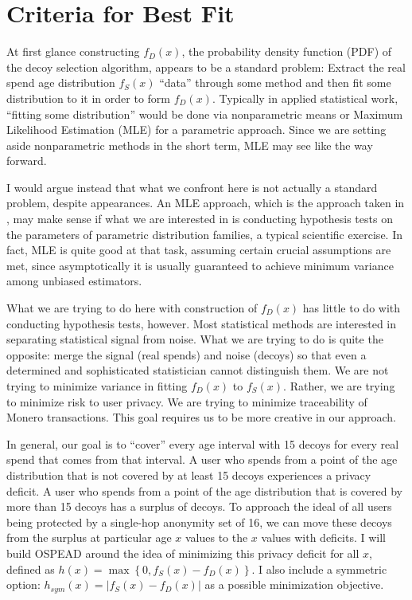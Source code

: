 \documentclass[english]{article}
\begin{document}
\section{Criteria for Best Fit\label{sec:Criteria-for-Best-Fit}}

At first glance constructing $f_{D}(x)$, the probability density
function (PDF) of the decoy selection algorithm, appears to be a standard
problem: Extract the real spend age distribution $f_{S}(x)$ ``data''
through some method and then fit some distribution to it in order
to form $f_{D}(x)$. Typically in applied statistical work, ``fitting
some distribution'' would be done via nonparametric means or Maximum
Likelihood Estimation (MLE) for a parametric approach. Since we are
setting aside nonparametric methods in the short term, MLE may see
like the way forward.

I would argue instead that what we confront here is not actually a
standard problem, despite appearances. An MLE approach, which is the
approach taken in \cite{2018}, may make sense if what we are interested
in is conducting hypothesis tests on the parameters of parametric
distribution families, a typical scientific exercise. In fact, MLE
is quite good at that task, assuming certain crucial assumptions are
met, since asymptotically it is usually guaranteed to achieve minimum
variance among unbiased estimators. 

What we are trying to do here with construction of $f_{D}(x)$ has
little to do with conducting hypothesis tests, however. Most statistical
methods are interested in separating statistical signal from noise.
What we are trying to do is quite the opposite: merge the signal (real
spends) and noise (decoys) so that even a determined and sophisticated
statistician cannot distinguish them. We are not trying to minimize
variance in fitting $f_{D}(x)$ to $f_{S}(x)$. Rather, we are trying
to minimize risk to user privacy. We are trying to minimize traceability
of Monero transactions. This goal requires us to be more creative
in our approach.

In general, our goal is to ``cover'' every age interval with 15
decoys for every real spend that comes from that interval. A user
who spends from a point of the age distribution that is not covered
by at least 15 decoys experiences a privacy deficit. A user who spends
from a point of the age distribution that is covered by more than
15 decoys has a surplus of decoys. To approach the ideal of all users
being protected by a single-hop anonymity set of 16, we can move these
decoys from the surplus at particular age $x$ values to the $x$
values with deficits. I will build OSPEAD around the idea of minimizing
this privacy deficit for all $x$, defined as $h(x)=\max\left\{ 0,f_{S}(x)-f_{D}(x)\right\} $.
I also include a symmetric option: $h_{sym}(x)=\left|f_{S}(x)-f_{D}(x)\right|$
as a possible minimization objective.
\end{document}
